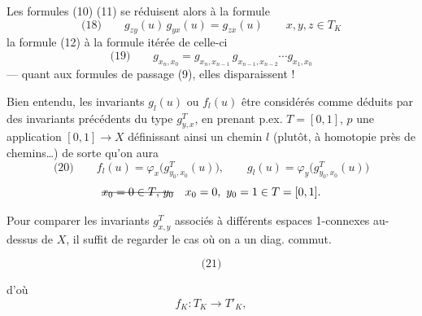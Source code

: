 \documentclass[11pt,a4paper]{article}
\begin{document}
Les formules (10) (11) se réduisent alors à la formule
\[
\text{(18)}\qquad g_{zy}(u)\,g_{yx}(u) = g_{zx}(u) \qquad x,y,z \in T_K
\]
la formule (12) à la formule itérée de celle-ci
\[
\text{(19)}\qquad g_{x_n,x_0} = g_{x_n,x_{n-1}}\,g_{x_{n-1},x_{n-2}}\cdots g_{x_1,x_0}
\]
— quant aux formules de passage (9), elles \struck{\ill{}} disparaissent !

Bien entendu, les invariants $g_l(u)$ ou $f_l(u)$  être considérés comme déduits par des invariants précédents du type $g^{T}_{y,x}$, en prenant p.ex. $T = [0,1]$, $p$ une application $[0,1] \to X$ définissant ainsi un \struck{\ill{}} chemin $l$ (plutôt, à homotopie près de chemins…) de sorte qu'on aura
\[
\text{(20)}\qquad f_l(u) = \varphi_x\bigl(g^{T}_{y_0,x_0}(u)\bigr), \qquad g_l(u) = \varphi_y\bigl(g^{T}_{y_0,x_0}(u)\bigr)
\]
\[
\text{\struck{$x_0 = 0 \in T$, $y_0$}} \quad x_0 = 0,\ y_0 = 1 \in T = [0,1] .
\]

   Pour comparer les invariants $g^{T}_{x,y}$ associés à différents espaces 1-connexes au-dessus de $X$, il suffit de regarder le cas où on a un diag. commut.

\[\text{(21)}\]


d'où
\[
f_K : T_K \longrightarrow T'_K ,
\]
\end{document}
